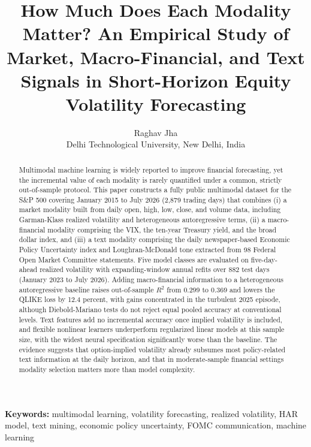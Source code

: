 \documentclass[10pt,twocolumn]{article}
\title{\Large\bfseries How Much Does Each Modality Matter? An Empirical Study of Market, Macro-Financial, and Text Signals in Short-Horizon Equity Volatility Forecasting}
\author{Raghav Jha\\ \normalsize Delhi Technological University, New Delhi, India}
\date{}
\begin{document}
\maketitle

\begin{abstract}
\noindent Multimodal machine learning is widely reported to improve financial forecasting, yet the incremental value of each modality is rarely quantified under a common, strictly out-of-sample protocol. This paper constructs a fully public multimodal dataset for the S\&P 500 covering January 2015 to July 2026 (2{,}879 trading days) that combines (i) a market modality built from daily open, high, low, close, and volume data, including Garman-Klass realized volatility and heterogeneous autoregressive terms, (ii) a macro-financial modality comprising the VIX, the ten-year Treasury yield, and the broad dollar index, and (iii) a text modality comprising the daily newspaper-based Economic Policy Uncertainty index and Loughran-McDonald tone extracted from 98 Federal Open Market Committee statements. Five model classes are evaluated on five-day-ahead realized volatility with expanding-window annual refits over 882 test days (January 2023 to July 2026). Adding macro-financial information to a heterogeneous autoregressive baseline raises out-of-sample $R^2$ from 0.299 to 0.369 and lowers the QLIKE loss by 12.4 percent, with gains concentrated in the turbulent 2025 episode, although Diebold-Mariano tests do not reject equal pooled accuracy at conventional levels. Text features add no incremental accuracy once implied volatility is included, and flexible nonlinear learners underperform regularized linear models at this sample size, with the widest neural specification significantly worse than the baseline. The evidence suggests that option-implied volatility already subsumes most policy-related text information at the daily horizon, and that in moderate-sample financial settings modality selection matters more than model complexity.
\end{abstract}

\vspace{2pt}
\noindent\textbf{Keywords:} multimodal learning, volatility forecasting, realized volatility, HAR model, text mining, economic policy uncertainty, FOMC communication, machine learning
\end{document}
